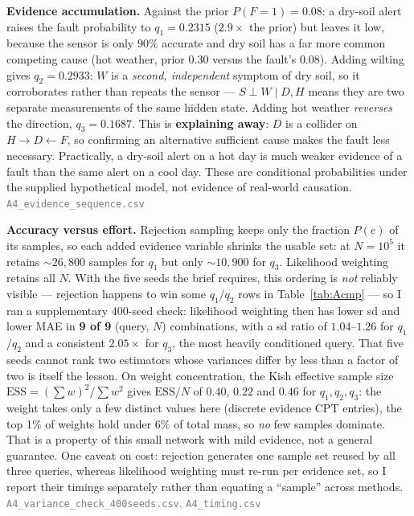 \documentclass[10pt,a4paper]{article}
\begin{document}
\textbf{Evidence accumulation.} Against the prior $P(F{=}1)=0.08$: a dry-soil alert raises the fault
probability to $q_1=0.2315$ ($2.9\times$ the prior) but leaves it low, because the sensor is only
90\% accurate and dry soil has a far more common competing cause (hot weather, prior $0.30$ versus
the fault's $0.08$). Adding wilting gives $q_2=0.2933$: $W$ is a \emph{second, independent} symptom
of dry soil, so it corroborates rather than repeats the sensor --- $S\perp W\mid D,H$ means they are
two separate measurements of the same hidden state. Adding hot weather \emph{reverses} the direction,
$q_3=0.1687$. This is \textbf{explaining away}: $D$ is a collider on $H\to D\leftarrow F$, so
confirming an alternative sufficient cause makes the fault less necessary. Practically, a dry-soil
alert on a hot day is much weaker evidence of a fault than the same alert on a cool day. These are
conditional probabilities under the supplied hypothetical model, not evidence of real-world
causation. \textcolor{gray}{\small\texttt{A4\_evidence\_sequence.csv}}

\textbf{Accuracy versus effort.} Rejection sampling keeps only the fraction $P(e)$ of its samples, so
each added evidence variable shrinks the usable set: at $N{=}10^5$ it retains ${\sim}26{,}800$
samples for $q_1$ but only ${\sim}10{,}900$ for $q_3$. Likelihood weighting retains all $N$. With the
five seeds the brief requires, this ordering is \emph{not} reliably visible --- rejection happens to
win some $q_1$/$q_2$ rows in Table~\ref{tab:Acmp} --- so I ran a supplementary 400-seed check:
likelihood weighting then has lower sd and lower MAE in \textbf{9 of 9} (query, $N$) combinations,
with a sd ratio of $1.04$--$1.26$ for $q_1$/$q_2$ and a consistent $2.05\times$ for $q_3$, the most
heavily conditioned query. That five seeds cannot rank two estimators whose variances differ by less
than a factor of two is itself the lesson. On weight concentration, the Kish effective sample size
$\mathrm{ESS}=(\sum w)^2/\sum w^2$ gives $\mathrm{ESS}/N$ of $0.40$, $0.22$ and $0.46$ for
$q_1,q_2,q_3$: the weight takes only a few distinct values here (discrete evidence CPT entries), the
top 1\% of weights hold under 6\% of total mass, so \emph{no} few samples dominate. That is a
property of this small network with mild evidence, not a general guarantee. One caveat on cost:
rejection generates one sample set reused by all three queries, whereas likelihood weighting must
re-run per evidence set, so I report their timings separately rather than equating a ``sample''
across methods. \textcolor{gray}{\small\texttt{A4\_variance\_check\_400seeds.csv}, \texttt{A4\_timing.csv}}
\end{document}
